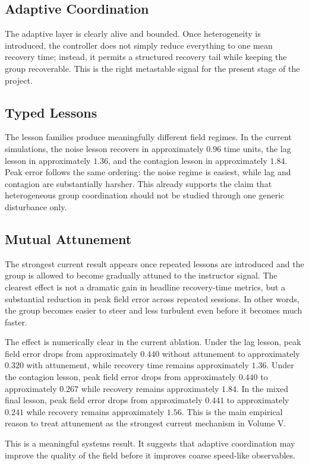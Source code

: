 \documentclass[12pt,a4paper]{article}
\begin{document}
\subsection{Adaptive Coordination}
The adaptive layer is clearly alive and bounded. Once heterogeneity is introduced, the controller does not simply reduce everything to one mean recovery time; instead, it permits a structured recovery tail while keeping the group recoverable. This is the right metastable signal for the present stage of the project.

\subsection{Typed Lessons}
The lesson families produce meaningfully different field regimes. In the current simulations, the noise lesson recovers in approximately $0.96$ time units, the lag lesson in approximately $1.36$, and the contagion lesson in approximately $1.84$. Peak error follows the same ordering: the noise regime is easiest, while lag and contagion are substantially harsher. This already supports the claim that heterogeneous group coordination should not be studied through one generic disturbance only.

\subsection{Mutual Attunement}
The strongest current result appears once repeated lessons are introduced and the group is allowed to become gradually attuned to the instructor signal. The clearest effect is not a dramatic gain in headline recovery-time metrics, but a substantial reduction in peak field error across repeated sessions. In other words, the group becomes easier to steer and less turbulent even before it becomes much faster.

The effect is numerically clear in the current ablation. Under the lag lesson, peak field error drops from approximately $0.440$ without attunement to approximately $0.320$ with attunement, while recovery time remains approximately $1.36$. Under the contagion lesson, peak field error drops from approximately $0.440$ to approximately $0.267$ while recovery remains approximately $1.84$. In the mixed final lesson, peak field error drops from approximately $0.441$ to approximately $0.241$ while recovery remains approximately $1.56$. This is the main empirical reason to treat attunement as the strongest current mechanism in Volume V.

This is a meaningful systems result. It suggests that adaptive coordination may improve the quality of the field before it improves coarse speed-like observables.
\end{document}
